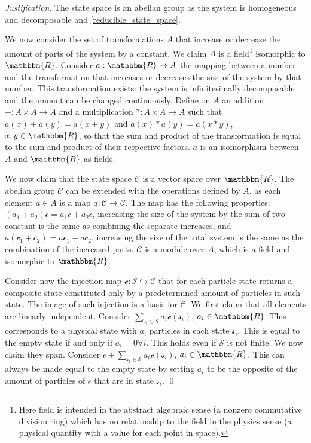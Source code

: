 \documentclass[aps,pra,10pt,twocolumn,floatfix,nofootinbib]{revtex4-1}
\theoremstyle{definition}
\newenvironment{justification}{\emph{Justification}.}{\qed}
\begin{document}
\begin{justification}
The state space is an abelian group as the system is homogeneous and decomposable and \ref{reducible_state_space}.

We now consider the set of transformations $A$ that increase or decrease the amount of parts of the system by a constant. We claim $A$ is a field\footnote{Here field is intended in the abstract algebraic sense (a nonzero commutative division ring) which has no relationship to the field in the physics sense (a physical quantity with a value for each point in space).} isomorphic to $\mathbbm{R}$. Consider $a: \mathbbm{R} \rightarrow A$ the mapping between a number and the transformation that increases or decreases the size of the system by that number. This transformation exists: the system is infinitesimally decomposable and the amount can be changed continuously. Define on $A$ an addition $+: A \times A \rightarrow A$ and a multiplication $*: A \times A \rightarrow A$ such that $a(x) + a(y) = a(x+y)$ and $a(x) * a(y) = a(x*y)$, $x,y \in \mathbbm{R}$, so that the sum and product of the transformation is equal to the sum and product of their respective factors. $a$ is an isomorphism between $A$ and $\mathbbm{R}$ as fields.

We now claim that the state space $\mathcal{C}$ is a vector space over $\mathbbm{R}$. The abelian group $\mathcal{C}$ can be extended with the operations defined by $A$, as each element $a \in A$ is a map $a : \mathcal{C} \rightarrow \mathcal{C}$. The map has the following properties: $(a_1 + a_2) \mathcal{c} = a_1 \mathcal{c} + a_2 \mathcal{c}$, increasing the size of the system by the sum of two constant is the same as combining the separate increases, and $a (\mathcal{c}_1 + \mathcal{c}_2) = a \mathcal{c}_1 + a \mathcal{c}_2$, increasing the size of the total system is the same as the combination of the increased parts. $\mathcal{C}$ is a module over $A$, which is a field and isomorphic to $\mathbbm{R}$.

Consider now the injection map $\mathcal{e}: \mathcal{S} \hookrightarrow \mathcal{C}$ that for each particle state returns a composite state constituted only by a predetermined amount of particles in such state. The image of such injection is a basis for $\mathcal{C}$. We first claim that all elements are linearly independent. Consider $\sum\limits_{\mathcal{s}_i \in \mathcal{S}} a_i \mathcal{e}(\mathcal{s}_i)$, $a_i \in \mathbbm{R}$. This corresponds to a physical state with $a_i$ particles in each state $\mathcal{s}_i$. This is equal to the empty state if and only if $a_i=0 \forall i$. This holds even if $\mathcal{S}$ is not finite. We now claim they span. Consider $\mathcal{c} + \sum\limits_{\mathcal{s}_i \in \mathcal{S}} a_i \mathcal{e}(\mathcal{s}_i)$, $a_i \in \mathbbm{R}$. This can always be made equal to the empty state by setting $a_i$ to be the opposite of the amount of particles of $\mathcal{c}$ that are in state $\mathcal{s}_i$.
\end{justification}
\end{document}
